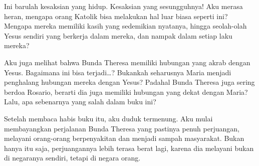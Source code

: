Ini barulah kesaksian yang hidup. Kesaksian yang sesungguhnya!
Aku merasa heran, mengapa orang Katolik bisa melakukan hal luar biasa seperti ini? Mengapa mereka memiliki kasih yang sedemikian nyatanya, hingga seolah-olah Yesus sendiri yang berkerja dalam mereka, dan nampak dalam setiap laku mereka?

Aku juga melihat bahwa Bunda Theresa memiliki hubungan yang akrab dengan Yesus. Bagaimana ini bisa terjadi…? Bukankah seharusnya Maria menjadi penghalang hubungan mereka dengan Yesus? Padahal Bunda Theresa juga sering berdoa Rosario, berarti dia juga memiliki hubungan yang dekat dengan Maria? Lalu, apa sebenarnya yang salah dalam buku ini?

Setelah membaca habis buku itu, aku duduk termenung. Aku mulai membayangkan perjalanan Bunda Theresa yang pastinya penuh perjuangan, melayani orang-orang berpenyakitan dan menjadi sampah masyarakat. Bukan hanya itu saja, perjuangannya lebih terasa berat lagi, karena dia melayani bukan di negaranya sendiri, tetapi di negara orang.

